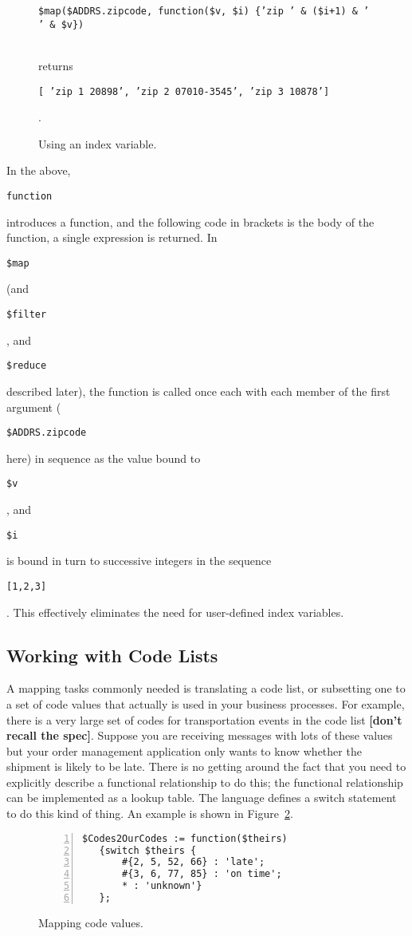 \documentclass[9pt,letterpaper]{article}
\newcommand{\stt}[1]{\begin{footnotesize}\texttt{#1}\end{footnotesize}}
\begin{document}
\begin{figure}[H]
    \caption{Using an index variable.}
    \label{code:index-in-map}
\vspace{3mm}
    \stt{\$map(\$ADDRS.zipcode, function(\$v, \$i) \{'zip ' \& (\$i+1) \& ' ' \& \$v\})}\\
\vspace{3mm}
returns \\
 \stt{[ 'zip 1 20898', 'zip 2 07010-3545', 'zip 3 10878']}.
\end{figure}

In the above, \stt{function} introduces a function, and the following code in brackets is the body of the function, a single expression is returned.
In \stt{\$map} (and \stt{\$filter}, and \stt{\$reduce} described later), the function is called once each with each member of the first argument (\stt{\$ADDRS.zipcode} here) in sequence
as the value bound to \stt{\$v}, and \stt{\$i} is bound in turn to successive integers in the sequence \stt{[1,2,3]}.
This effectively eliminates the need for user-defined index variables.

\subsection{Working with Code Lists}

A mapping tasks commonly needed is translating a code list, or subsetting one to a set of code values that actually is used in your business processes.
For example, there is a very large set of codes for transportation events in the code list \textbf{[don't recall the spec]}.
Suppose you are receiving messages with lots of these values but your order management application only wants to know whether the shipment is likely to be late.
There is no getting around the fact that you need to explicitly describe a functional relationship to do this; the functional relationship can be implemented as a lookup table.
The language defines a switch statement to do this kind of thing.
An example is shown in Figure~\ref{code:mapping-codes}.

\begin{figure}[H]
    \caption{Mapping code values.}
    \label{code:mapping-codes}
\begin{lstlisting}[numberstyle=\scriptsize,basicstyle=\ttfamily\scriptsize,numbers=left,stepnumber=1,breaklines=true]
  $Codes2OurCodes := function($theirs)
   {switch $theirs {
       #{2, 5, 52, 66} : 'late';
       #{3, 6, 77, 85} : 'on time';
       * : 'unknown'}
   };
\end{lstlisting}
\end{figure}
\end{document}

